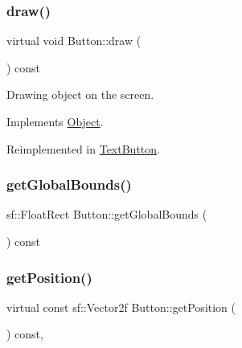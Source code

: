 \mbox{\label{class_button_a99e75218b31357786cff815f87f1a093}} 
\subsubsection{\texorpdfstring{draw()}{draw()}}
{\footnotesize\ttfamily virtual void Button\+::draw (\begin{DoxyParamCaption}\item[{\mbox{\hyperlink{class_game_engine}{Game\+Engine}} $\ast$}]{ }\end{DoxyParamCaption}) const\hspace{0.3cm}{\ttfamily [virtual]}}



Drawing object on the screen. 



Implements \mbox{\hyperlink{class_object_af9862406dcd271bd45580737df468af4}{Object}}.



Reimplemented in \mbox{\hyperlink{class_text_button_a8af6b4a6e9084f157ffb015d29a02fcf}{Text\+Button}}.

\mbox{\label{class_button_ab9d2e98e4940309543a9c94509f99437}} 
\subsubsection{\texorpdfstring{getGlobalBounds()}{getGlobalBounds()}}
{\footnotesize\ttfamily sf\+::\+Float\+Rect Button\+::get\+Global\+Bounds (\begin{DoxyParamCaption}{ }\end{DoxyParamCaption}) const\hspace{0.3cm}{\ttfamily [inline]}}

\mbox{\label{class_button_a01ff4aace35c7d0c4d8b35eda290378f}} 
\subsubsection{\texorpdfstring{getPosition()}{getPosition()}}
{\footnotesize\ttfamily virtual const sf\+::\+Vector2f Button\+::get\+Position (\begin{DoxyParamCaption}{ }\end{DoxyParamCaption}) const\hspace{0.3cm}{\ttfamily [inline]}, {\ttfamily [virtual]}}



